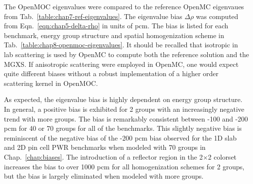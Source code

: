 The OpenMOC eigenvalues were compared to the reference OpenMC eigenvaues from Tab.~\ref{table:chap7-ref-eigenvalues}. The eigenvalue bias $\Delta\rho$ was computed from Eqn.~\ref{eqn:chap5-delta-rho} in units of \ac{pcm}. The bias is listed for each benchmark, energy group structure and spatial homogenization scheme in Tab.~\ref{table:chap8-openmoc-eigenvalues}. It should be recalled that isotropic in lab scattering is used by OpenMC to compute both the reference solution and the \ac{MGXS}. If anisotropic scattering were employed in OpenMC, one would expect quite different biases without a robust implementation of a higher order scattering kernel in OpenMOC.

As expected, the eigenvalue bias is highly dependent on energy group structure. In general, a positive bias is exhibited for 2 groups with an increasingly negative trend with more groups. The bias is remarkably consistent between -100 and -200 \ac{pcm} for 40 or 70 groups for all of the benchmarks. This slightly negative bias is reminiscent of the negative bias of the -200 \ac{pcm} bias observed for the 1D slab and 2D pin cell \ac{PWR} benchmarks when modeled with 70 groups in Chap.~\ref{chap:biases}. The introduction of a reflector region in the 2$\times$2 colorset increases the bias to over 1000 \ac{pcm} for all homogenization schemes for 2 groups, but the bias is largely eliminated when modeled with more groups.

